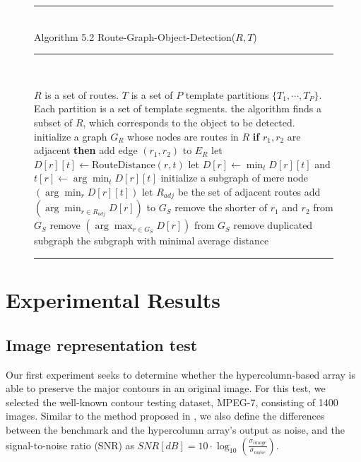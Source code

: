 \documentclass{article}
\newenvironment{myalgorithm}[1]%
{\begin{figure}[!h]\small\noindent\rule{\linewidth}{1pt}\\#1\vspace{-0.5em}\\%
\rule{\linewidth}{0.5pt}\\\vspace{-1.5em}}%
{\vspace{-0.5em}\rule{\linewidth}{1pt}\end{figure}}
\begin{document}
\begin{myalgorithm}{Algorithm 5.2 Route-Graph-Object-Detection($R,T$)}
\begin{algorithmic}[1]
\REQUIRE $R$ is a set of routes. $T$ is a set of $P$ template partitions
$\{T_1,\cdots,T_P\}$. Each partition is a set of template segments.
\ENSURE the algorithm finds a subset of $R$, which corresponds to the object to be detected.
\STATE initialize a graph $G_R$ whose nodes are routes in $R$
  \STATE \textbf{if} $r_1,r_2$ are adjacent \textbf{then} add edge $(r_1,r_2)$ to $E_R$
\ENDFOR
{}
    \STATE let $D[r][t]\leftarrow\mathrm{RouteDistance}(r,t)$
  \ENDFOR
    \STATE let $D[r]\leftarrow\min_t D[r][t]$ and $t[r]\leftarrow\arg\min_t D[r][t]$
  \ENDFOR
    \STATE initialize a subgraph of mere node $(\arg\min_r D[r][t])$
  \ENDFOR
  \REPEAT
      \STATE let $R_{adj}$ be the set of adjacent routes
        \STATE add $(\arg\min_{r\in R_{adj}}D[r])$ to $G_S$
      \ENDIF
        \STATE remove the shorter of $r_1$ and $r_2$ from $G_S$
      \ENDIF
        \STATE remove $(\arg\max_{r\in G_S}D[r])$ from $G_S$
      \ENDIF
    \ENDFOR
    \STATE remove duplicated subgraph
\ENDFOR
\RETURN the subgraph with minimal average distance
\end{algorithmic}
\end{myalgorithm}

\section{Experimental Results}

\subsection{Image representation test}

Our first experiment seeks to determine whether the hypercolumn-based array is able to preserve the major contours in an original image. 
For this test, we selected the well-known contour testing dataset, MPEG-7, consisting of 1400 images. 
Similar to the method proposed in \cite{russ1995}, 
we also define the differences between the benchmark and the hypercolumn array's output as noise, 
and the signal-to-noise ratio (SNR) as $SNR[dB]=10\cdot\log_10(\frac{\sigma_{image}}{\sigma_{noise}})$.
\end{document}
